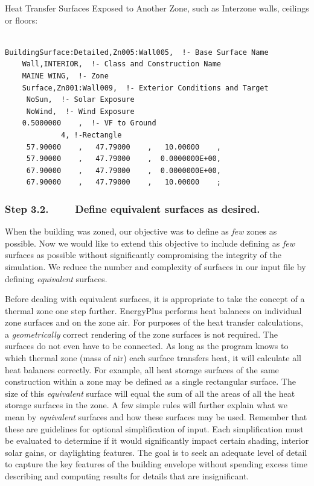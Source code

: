Heat Transfer Surfaces Exposed to Another Zone, such as Interzone walls, ceilings or floors:

\begin{lstlisting}

BuildingSurface:Detailed,Zn005:Wall005,  !- Base Surface Name
    Wall,INTERIOR,  !- Class and Construction Name
    MAINE WING,  !- Zone
    Surface,Zn001:Wall009,  !- Exterior Conditions and Target
     NoSun,  !- Solar Exposure
     NoWind,  !- Wind Exposure
    0.5000000    ,  !- VF to Ground
             4, !-Rectangle
     57.90000    ,   47.79000    ,   10.00000    ,
     57.90000    ,   47.79000    ,  0.0000000E+00,
     67.90000    ,   47.79000    ,  0.0000000E+00,
     67.90000    ,   47.79000    ,   10.00000    ;

\end{lstlisting}

\subsubsection{Step 3.2.~~~~ Define equivalent surfaces as desired.}\label{step-3.2.-define-equivalent-surfaces-as-desired.}

When the building was zoned, our objective was to define as \emph{few} zones as possible. Now we would like to extend this objective to include defining as \emph{few} surfaces as possible without significantly compromising the integrity of the simulation. We reduce the number and complexity of surfaces in our input file by defining \emph{equivalent} surfaces.

Before dealing with equivalent surfaces, it is appropriate to take the concept of a thermal zone one step further. EnergyPlus performs heat balances on individual zone surfaces and on the zone air. For purposes of the heat transfer calculations, a \emph{geometrically} correct rendering of the zone surfaces is not required. The surfaces do not even have to be connected. As long as the program knows to which thermal zone (mass of air) each surface transfers heat, it will calculate all heat balances correctly. For example, all heat storage surfaces of the same construction within a zone may be defined as a single rectangular surface. The size of this \emph{equivalent} surface will equal the sum of all the areas of all the heat storage surfaces in the zone. A few simple rules will further explain what we mean by \emph{equivalent} surfaces and how these surfaces may be used. Remember that these are guidelines for optional simplification of input. Each simplification must be evaluated to determine if it would significantly impact certain shading, interior solar gains, or daylighting features. The goal is to seek an adequate level of detail to capture the key features of the building envelope without spending excess time describing and computing results for details that are insignificant.

